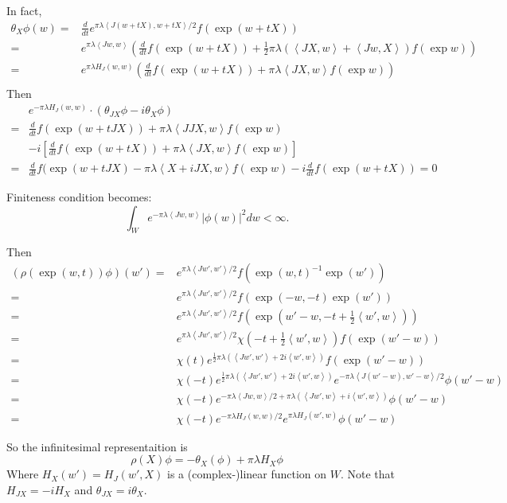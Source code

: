 \documentclass[12pt]{article}
\def\inn#1#2{\left\langle{#1},{#2}\right\rangle}
\def\abs#1{\left|{#1}\right|}
\def\ddt{\frac{d}{dt}}
\begin{document}
In fact, 
\[
\begin{split}
\theta_X \phi(w) =& \ddt e^{\pi \lambda \inn{J(w+tX)}{w+tX}/2} f(\exp(w+tX))\\
= &  e^{\pi \lambda \inn{Jw}{w}}(\ddt f(\exp(w+tX)) 
+ \frac{1}{2}\pi\lambda (\inn{JX}{w}+\inn{Jw}{X}) f(\exp w )) \\
= &  e^{\pi \lambda H_J(w,w)}(\ddt f(\exp(w+tX)) + \pi\lambda \inn{JX}{w} 
f(\exp w)) \\
\end{split}
\] 
Then 
\[
\begin{split}
& e^{-\pi \lambda H_J(w,w)}\cdot (\theta_{JX}\phi - i\theta_{X}\phi) \\
= & \ddt f(\exp(w+tJX)) + \pi\lambda \inn{JJX}{w} f(\exp w)\\
&-i \left[ \ddt f(\exp(w+tX)) + \pi\lambda \inn{JX}{w} f(\exp w)\right]\\
=& \ddt f(\exp(w+tJX)  - \pi \lambda \inn{X+iJX}{w} f(\exp w)
- i \ddt f(\exp(w+tX))= 0 
\end{split}
\]

Finiteness condition becomes:
\[
\int_W e^{-\pi \lambda \inn{Jw}{w}}\abs{\phi(w)}^2dw < \infty.
\]

Then
\[
\begin{split}
(\rho(\exp(w,t))\phi)(w') 
=& e^{\pi \lambda \inn{Jw'}{w'}/2} f(\exp(w,t)^{-1}\exp(w'))\\
=& e^{\pi \lambda \inn{Jw'}{w'}/2} f(\exp(-w,-t)\exp(w'))\\
=& e^{\pi \lambda \inn{Jw'}{w'}/2} f(\exp(w'-w,-t+\frac{1}{2}\inn{w'}{w}))\\
=& e^{\pi \lambda \inn{Jw'}{w'}/2} \chi(-t+ \frac{1}{2}\inn{w'}{w}) f(\exp(w'-w))\\
=& \chi(t) e^{\frac{1}{2}\pi \lambda (\inn{Jw'}{w'}+2i \inn{w'}{w})}
 f(\exp(w'-w)) \\
=& \chi(-t) e^{\frac{1}{2}\pi \lambda (\inn{Jw'}{w'}+2i \inn{w'}{w})} 
e^{-\pi \lambda \inn{J(w'-w)}{w'-w}/2} \phi(w'-w)\\
=& \chi(-t) e^{-\pi \lambda \inn{Jw}{w}/2+ \pi\lambda (\inn{Jw'}{w}+i\inn{w'}{w})} 
 \phi(w'-w) \\
=& \chi(-t) e^{-\pi\lambda H_J(w,w)/2} e^{\pi\lambda H_J(w',w)} \phi(w'-w)
\end{split}
\]


So the infinitesimal representaition is 
\[
\rho(X) \phi = -\theta_X(\phi) +\pi\lambda H_X \phi
\]
Where $H_X(w') = H_J(w',X)$ is a (complex-)linear function on $W$.
Note that $H_{JX} = -i H_X$ and $\theta_{JX} = i\theta_X$.
\end{document}
